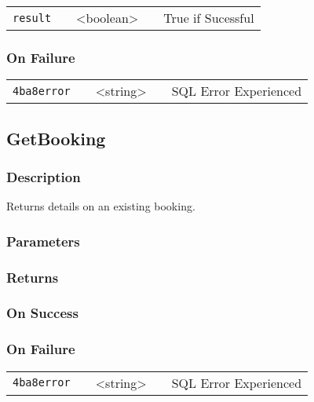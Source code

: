 \documentclass[a4paper,12pt]{article}
\begin{document}
\begin{tabular}{ccccc}
\verb!result! & \vspace{15mm} & <boolean> & \vspace{15mm} & True if Sucessful \\
\end{tabular}

\subsubsection{On Failure}

\begin{tabular}{ccccc}
\verb!4ba8error! & \vspace{15mm} & <string> & \vspace{15mm} & SQL Error Experienced \\
\end{tabular}


\subsection{GetBooking}

\subsubsection{Description}

Returns details on an existing booking.

\subsubsection{Parameters}

\subsubsection{Returns}

\subsubsection{On Success}

\subsubsection{On Failure}

\begin{tabular}{ccccc}
\verb!4ba8error! & \vspace{15mm} & <string> & \vspace{15mm} & SQL Error Experienced \\
\end{tabular}
\end{document}
